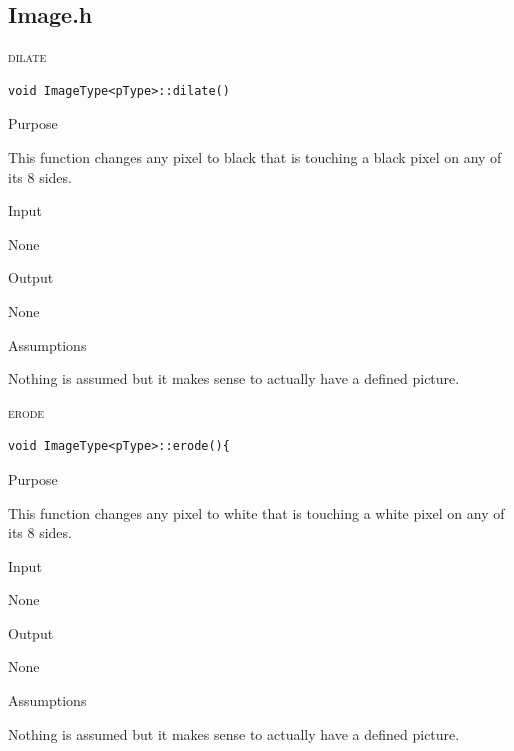 \documentclass[pdftex, 11pt]{article}
\begin{document}
\subsection{Image.h}
\begin{description}

	\item{\textsc{dilate}}
		\begin{description}

\begin{lstlisting}
void ImageType<pType>::dilate()
\end{lstlisting}

			\item{Purpose}

				This function changes any pixel to black that is
				touching a black pixel on any of its 8 sides.

			\item{Input}

				None

			\item{Output}

				None

			\item{Assumptions}

				Nothing is assumed but it makes sense to
				actually have a defined picture.

		\end{description}

	\item{\textsc{erode}}
		\begin{description}

\begin{lstlisting}
void ImageType<pType>::erode(){
\end{lstlisting}

			\item{Purpose}

				This function changes any pixel to white that is
				touching a white pixel on any of its 8 sides.

			\item{Input}

				None

			\item{Output}

				None

			\item{Assumptions}

				Nothing is assumed but it makes sense to
				actually have a defined picture.



\end{description}
\end{description}
\end{document}
